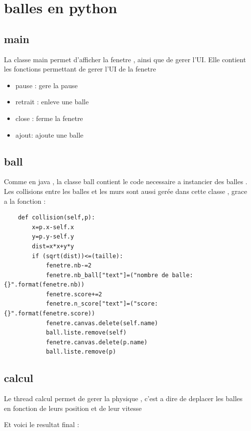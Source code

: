 \documentclass{report}
\begin{document}
\section{balles en python}
\subsection{main }
La classe main permet d'afficher la fenetre , ainsi que de gerer l'UI. Elle contient les fonctions permettant de gerer l'UI de la fenetre

\begin{itemize}
\item pause : gere la pause
\item retrait : enleve une balle
\item close : ferme la fenetre

\item ajout: ajoute une balle
\end{itemize}

\subsection{ball }
Comme en java , la classe ball contient le code necessaire a instancier des balles . Les collisions entre les balles et les murs sont aussi
gerée dans cette classe  , grace a la fonction : 
\begin{verbatim}
	def collision(self,p):
		x=p.x-self.x
		y=p.y-self.y
		dist=x*x+y*y
		if (sqrt(dist))<=(taille):
			fenetre.nb-=2
			fenetre.nb_ball["text"]=("nombre de balle: {}".format(fenetre.nb))
			fenetre.score+=2
			fenetre.n_score["text"]=("score: {}".format(fenetre.score))
			fenetre.canvas.delete(self.name)
			ball.liste.remove(self)
			fenetre.canvas.delete(p.name)
			ball.liste.remove(p)
\end{verbatim}

\subsection{calcul }
Le thread calcul permet de gerer la physique , c'est a dire de deplacer les balles en fonction de leurs position et de leur vitesse



Et voici le resultat final : 
\end{document}
